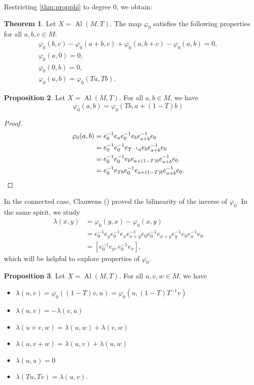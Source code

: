 \documentclass[a4paper,11pt]{amsart}
\theoremstyle{definition}
\newtheorem{thm}{Theorem}
\newtheorem{prop}[thm]{Proposition}
\DeclareMathOperator{\Al}{Al}
\begin{document}
Restricting \cref{thm:propphi} to degree $0$, we obtain:
\begin{thm}
Let $X=\Al(M,T)$.
The map $\varphi_0$ satisfies the following properties for all $a,b,c\in M$:
\begin{align}
&\varphi_0(b,c) - \varphi_0(a+b, c) + \varphi_0(a,b+c) - \varphi_0(a, b)= 0, \label{conditioncocycle0}&\\
& \varphi_0(a,0)= 0, & \\
& \varphi_0(0,b)= 0, & \\
& \varphi_0(a, b) = \varphi_0(T a, T b). &
\end{align}
\end{thm}

\begin{prop}\label{tressage0}
Let $X=\Al(M,T)$.
For all $a,b\in M$, we have
\[
\varphi_0(a,b) = \varphi_0(Tb, a + (1-T) b)
\]
\end{prop}

\begin{proof}
\begin{align*}
\varphi_0(a,b) & = e_0^{-1} e_a e_0^{-1} e_b e_{a+b}^{-1} e_0 \\
& = e_0^{-1} e_0^{-1} e_{T^{-1} a}  e_b e_{a+b}^{-1} e_0 \\
& = e_0^{-1} e_0^{-1} e_b e_{ a + (1-T)b}   e_{a+b}^{-1} e_0 \\
& = e_0^{-1} e_{Tb} e_0^{-1} e_{ a + (1-T)b} e_{a+b}^{-1} e_0. \qedhere
\end{align*}
\end{proof}

In the connected case, Clauwens (\cite{clauwensAdjointGroupAlexander2010}) proved the bilinearity of the inverse of $\varphi_0$.
In the same spirit, we study
\begin{align*}
\lambda(x,y) & = \varphi_0(y,x) - \varphi_0(x,y) \\
& = e_0^{-1} e_y e_0^{-1} e_x e_{x+y}^{-1} e_0 e_0^{-1} e_{x+y} e_y^{-1} e_0 e_x^{-1} e_0 \\
& = \left[ e_0^{-1} e_y, e_0^{-1} e_x \right],
\end{align*}
which will be helpful to explore properties of $\varphi_0$.

\begin{prop}
Let $X=\Al(M,T)$.
For all $u,v,w\in M$, we have
\begin{itemize}
\item $\lambda(u,v) = \varphi_0( (1-T)v, u) = \varphi_0(u, (1-T) T^{-1} v)$
\item $\lambda(u,v) = -\lambda(v,u)$
\item $\lambda(u+v,w) = \lambda(u,w) + \lambda(v,w)$
\item $\lambda(u,v+w) = \lambda(u,v) + \lambda(u,w)$
\item $\lambda(u,u) = 0$
\item $\lambda(Tu,Tv) = \lambda(u,v)$.
\end{itemize}
\end{prop}
\end{document}
